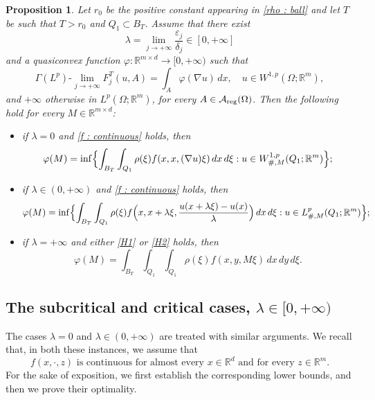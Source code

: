 \documentclass{article}
\newtheorem{proposition}[lemma]{Proposition}
\theoremstyle{definition}
\newcommand{\f}{\varphi}
\newcommand{\ej}{\varepsilon_j}
\newcommand{\dej}{\delta_j}
\newcommand{\R}{\mathbb{R}}
\newcommand{\A}{\mathcal{A}}
\begin{document}
\begin{proposition}\label{prop : main}  Let $r_0$ be the positive constant appearing in \eqref{rho : ball} and let $T$ be such that $T>r_0$ and $Q_1\subset B_T$. Assume that there exist
\begin{equation*}
   \lambda= \lim_{j\to+\infty}\frac{\ej}{\dej}\in[0,+\infty]
\end{equation*}
and a quasiconvex function $\varphi: \R^{m\times d}\to[0,+\infty)$ such that 
\begin{equation}\label{ipotesi rappresentazione}
     \Gamma(L^p)\text{-}\lim_{j\to+\infty} F^T_j(u,A) = \int_A \f(\nabla u)\, dx, \quad u\in W^{1,p}(\Omega;\R^m),
\end{equation}
and $+\infty$ otherwise in $L^p(\Omega;\R^m)$, for every $A\in\A_{\rm reg}(\Omega)$. Then the following hold for every $M\in \R^{m\times d}$: 
 \begin{itemize}
        \item[(i)] if $\lambda=0$ and \eqref{f : continuous} holds, then
        \begin{equation*}
            \f(M)= \inf\Bigl\{ \int_{B_T} \int_{Q_1} \rho(\xi)f(x,x,(\nabla u ) \xi)\, dx\,d\xi : u\in W^{1,p}_{\#,M}(Q_1; \R^m) \Bigr\};
        \end{equation*}
        \item[(ii)] if $\lambda\in(0,+\infty)$ and \eqref{f : continuous} holds, then 
         \begin{equation*}
            \f(M)= \inf\Bigl\{ \int_{B_T}\int_{Q_1} \rho(\xi) f\Bigl(x,x+\lambda\xi,\frac{u(x+\lambda\xi)-u(x)}{\lambda}\Bigr)\, dx\, d\xi : u\in L^p_{\#,M}(Q_1;\R^m) \Bigr\};
        \end{equation*}
        \item[(iii)] if $\lambda=+\infty$ and either \eqref{H1} or \eqref{H2} holds, then
        \begin{equation*}
            \f(M)=\int_{B_T} \int_{Q_1}\int_{Q_1} \rho(\xi) f(x,y,M\xi)\, dx\,dy\,d\xi.
        \end{equation*}
    \end{itemize}
\end{proposition}

\subsection{The subcritical and critical cases, $\lambda\in[0,+\infty)$}

The cases $\lambda=0$ and $\lambda\in(0,+\infty)$ are treated with similar arguments. We recall that, in both these instances, we assume that
\begin{equation*} 
    \tag{H0}
f(x,\cdot,z) \text{ is continuous for almost every } x\in \R^d \text{ and for every } z\in \R^m.
\end{equation*}
 For the sake of exposition, we first establish the corresponding lower bounds, and then we prove their optimality.
 
\end{document}
